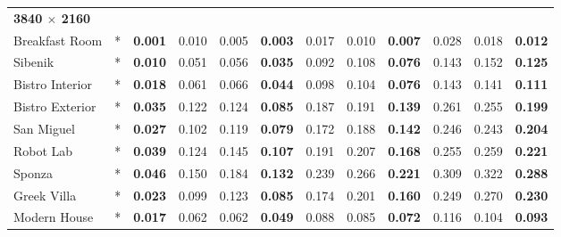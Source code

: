 \begin{table*}[t]
\begin{tabular}{l cc | ccc | ccc | ccc}
\hline
\textbf{3840 $\times$ 2160}   & & & & & & & & & & & \\
Breakfast Room                & *              & \textbf{0.001}          & 0.010             & 0.005          & \textbf{0.003}          & 0.017             & 0.010          & \textbf{0.007}          & 0.028             & 0.018          & \textbf{0.012}          \\
Sibenik                       & *              & \textbf{0.010}          & 0.051             & 0.056          & \textbf{0.035}          & 0.092             & 0.108          & \textbf{0.076}          & 0.143             & 0.152          & \textbf{0.125}          \\
Bistro Interior               & *              & \textbf{0.018}          & 0.061             & 0.066          & \textbf{0.044}          & 0.098             & 0.104          & \textbf{0.076}          & 0.143             & 0.141          & \textbf{0.111}          \\
Bistro Exterior               & *              & \textbf{0.035}          & 0.122             & 0.124          & \textbf{0.085}          & 0.187             & 0.191          & \textbf{0.139}          & 0.261             & 0.255          & \textbf{0.199}          \\
San Miguel                    & *              & \textbf{0.027}          & 0.102             & 0.119          & \textbf{0.079}          & 0.172             & 0.188          & \textbf{0.142}          & 0.246             & 0.243          & \textbf{0.204}          \\
Robot Lab                     & *              & \textbf{0.039}          & 0.124             & 0.145          & \textbf{0.107}          & 0.191             & 0.207          & \textbf{0.168}          & 0.255             & 0.259          & \textbf{0.221}          \\
Sponza                        & *              & \textbf{0.046}          & 0.150             & 0.184          & \textbf{0.132}          & 0.239             & 0.266          & \textbf{0.221}          & 0.309             & 0.322          & \textbf{0.288}          \\
Greek Villa                   & *              & \textbf{0.023}          & 0.099             & 0.123          & \textbf{0.085}          & 0.174             & 0.201          & \textbf{0.160}          & 0.249             & 0.270          & \textbf{0.230}          \\
Modern House                  & *              & \textbf{0.017}          & 0.062             & 0.062          & \textbf{0.049}          & 0.088             & 0.085          & \textbf{0.072}          & 0.116             & 0.104          & \textbf{0.093}          \\

\end{tabular}
\end{table*}
